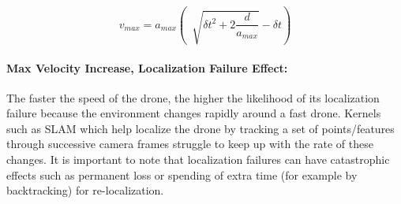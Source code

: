 \begin{equation}
\label{eq:runtime-compute-bound}
v_{max} = a_{max}(~\sqrt[]{\delta{t}^2 + 2\frac{d}{a_{max}}} - \delta{t})
\end{equation}
\setlength{\belowcaptionskip}{-1ex}

\paragraph{Max Velocity Increase, Localization Failure Effect:} The faster the speed of the drone, the higher the likelihood of its localization failure because the environment changes rapidly around a fast drone. Kernels such as SLAM which help localize the drone by tracking a set of points/features through successive camera frames struggle to keep up with the rate of these changes. It is important to note that localization failures can have catastrophic effects such as permanent loss or spending of extra time (for example by backtracking) for re-localization. 

